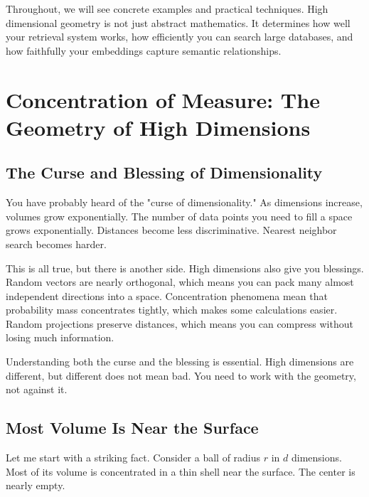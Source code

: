 Throughout, we will see concrete examples and practical techniques. High dimensional geometry is not just abstract mathematics. It determines how well your retrieval system works, how efficiently you can search large databases, and how faithfully your embeddings capture semantic relationships.

\vspace{2em}

\section{Concentration of Measure: The Geometry of High Dimensions}

\subsection{The Curse and Blessing of Dimensionality}

You have probably heard of the "curse of dimensionality." As dimensions increase, volumes grow exponentially. The number of data points you need to fill a space grows exponentially. Distances become less discriminative. Nearest neighbor search becomes harder.

This is all true, but there is another side. High dimensions also give you blessings. Random vectors are nearly orthogonal, which means you can pack many almost independent directions into a space. Concentration phenomena mean that probability mass concentrates tightly, which makes some calculations easier. Random projections preserve distances, which means you can compress without losing much information.

\vspace{1em}

Understanding both the curse and the blessing is essential. High dimensions are different, but different does not mean bad. You need to work with the geometry, not against it.

\vspace{1.5em}

\subsection{Most Volume Is Near the Surface}

Let me start with a striking fact. Consider a ball of radius $r$ in $d$ dimensions. Most of its volume is concentrated in a thin shell near the surface. The center is nearly empty.

